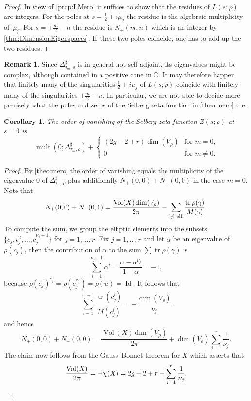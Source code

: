 \documentclass[10pt]{amsart}
\theoremstyle{plain}
\newtheorem{coro}[thm]{Corollary}
\theoremstyle{definition}
\newtheorem{rmrk}[thm]{Remark}
\theoremstyle{remark}
\newcommand{\C}{\mathbb{C}}
\DeclareMathOperator{\tr}{tr}
\DeclareMathOperator{\Vol}{Vol}
\DeclareMathOperator{\Id}{Id}
\numberwithin{equation}{section}
\DeclareMathOperator{\mult}{mult}
\begin{document}
\begin{proof}
In view of \cref{prop:LMero} it suffices to show that the residues of $L(s;\rho)$ are integers. For the poles at $s=\frac{1}{2}\pm i\mu_j$ the residue is the algebraic multiplicity of~$\mu_j$. For $s=\mp\frac{m}{2}-n$ the residue is $N_\pm(m,n)$ which is an integer by \cref{thm:DimensionEigenspaces}. If~these two poles coincide, one has to add up the two residues.
\end{proof}

\begin{rmrk}
Since $\Delta_{\tau_m,\rho}^\sharp$ is in general not self-adjoint, its eigenvalues might be complex, although contained in a positive cone in $\C$. It may therefore happen that finitely many of the singularities $\frac{1}{2}\pm i\mu_j$ of $L(s;\rho)$ coincide with finitely many of the singularities $\pm\frac{m}{2}-n$. In particular, we are not able to decide more precisely what the poles and zeros of the Selberg zeta function in \cref{theo:mero} are.
\end{rmrk}

\begin{coro}\label{coro:SelbergVanishingAtZero}
The order of vanishing of the Selberg zeta function $Z(s;\rho)$ at $s=0$ is
\[
\mult(0;\Delta_{\tau_m,\rho}^\sharp) + \begin{cases}(2g-2+r)\dim(V_\rho)&\mbox{for $m=0$,}\\0&\mbox{for $m\neq0$.}\end{cases}
\]
\end{coro}

\begin{proof}
By \cref{theo:mero} the order of vanishing equals the multiplicity of the eigenvalue $0$ of $\Delta_{\tau_m,\rho}^\sharp$ plus additionally $N_+(0,0)+N_-(0,0)$ in the case $m=0$. Note that
\[
N_+(0,0)+N_-(0,0) = \frac{\Vol(X)\dim(V_\rho)}{2\pi}-\sum_{[\gamma]\textup{ ell.}}\frac{\tr\rho(\gamma)}{M(\gamma)}.
\]
To compute the sum, we group the elliptic elements into the subsets $\{c_j,c_j^2,\ldots,c_j^{\nu_j-1}\}$ for $j=1,\ldots,r$. Fix $j=1,\ldots,r$ and let $\alpha$ be an eigenvalue of $\rho(c_j)$, then the contribution of $\alpha$ to the sum $\sum\tr\rho(\gamma)$ is
\[
\sum_{i=1}^{\nu_j-1}\alpha^i = \frac{\alpha-\alpha^{\nu_j}}{1-\alpha} = -1,
\]
because $\rho(c_j)^{\nu_j}=\rho(c_j^{\nu_j})=\rho(u)=\Id$. It follows that
\[
\sum_{i=1}^{\nu_j-1}\frac{\tr(c_j^i)}{M(c_j^i)} = -\frac{\dim(V_\rho)}{\nu_j}
\]
and hence
\[
N_+(0,0)+N_-(0,0) = \frac{\Vol(X)\dim(V_\rho)}{2\pi}+\dim(V_\rho)\sum_{j=1}^r\frac{1}{\nu_j}.
\]
The claim now follows from the Gauss--Bonnet theorem for $X$ which asserts that
\begin{equation}
\frac{\Vol(X)}{2\pi} = -\chi(X) = 2g-2+r-\sum_{j=1}^r\frac{1}{\nu_j}.\label{eq:GaussBonnet}\qedhere
\end{equation}
\end{proof}
\end{document}
